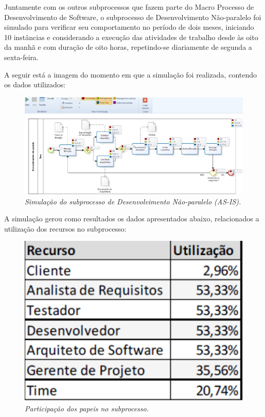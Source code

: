 Juntamente com os outros subprocessos que fazem parte do Macro Processo de Desenvolvimento de Software, o subprocesso de Desenvolvimento Não-paralelo foi simulado para verificar seu comportamento no período de dois meses, iniciando 10 instâncias e considerando a execução das atividades de trabalho desde às oito da manhã e com duração de oito horas, repetindo-se diariamente de segunda a sexta-feira.

A seguir está a imagem do momento em que a simulação foi realizada, contendo os dados utilizados:

\begin{figure}[H]
\centering\includegraphics[scale=0.3]{figuras/simulacaoAsIs.png}
\caption{\textit{ Simulação do subprocesso de Desenvolvimento Não-paralelo (AS-IS).}}
\end{figure}

A simulação gerou como resultados os dados apresentados abaixo, relacionados a utilização dos recursos no subprocesso:

\begin{figure}[H]
\centering\includegraphics[scale=0.5]{figuras/participacaoPapeis.png}
\caption{\textit{Participação dos papeis no subprocesso.}}
\end{figure}

